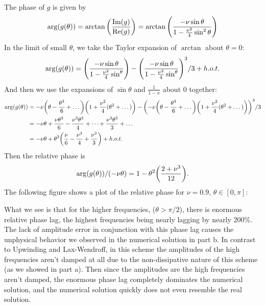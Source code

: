 \documentclass[12pt]{article}
\begin{document}
The phase of $g$ is given by
$$\arg(g(\theta)) = \arctan\qty(\dfrac{\Im(g)}{\Re(g)})= \arctan\qty(\dfrac{-\nu\sin\theta}{1-\frac{\nu^2}{4}\sin^2\theta}) $$
In the limit of small $\theta$, we take the Taylor expansion of $\arctan$ about $\theta=0$:
$$\arg(g(\theta)) = \qty(\dfrac{-\nu\sin\theta}{1-\frac{\nu^2}{4}\sin^\theta}) - \qty(\dfrac{-\nu\sin\theta}{1-\frac{\nu^2}{4}\sin^\theta})^3/3 + h.o.t.$$
And then we use the expansions of $\sin\theta$ and $\frac{1}{1-x}$ about 0 together:
\begin{align*}
\arg(g(\theta)) &= -\nu\qty(\theta-\frac{\theta^3}{6}+\dots)\qty(1+\frac{\nu^2}{4}(\theta^2 + \dots)) - \qty(-\nu\qty(\theta-\frac{\theta^3}{6}+\dots)\qty(1+\frac{\nu^2}{4}(\theta^2 + \dots)))^3/3 \\
&= -\nu \theta + \frac{\nu\theta^3}{6} - \frac{\nu^3\theta^3}{4} + \dots + \dfrac{\nu^3\theta^3}{3} + \dots \\
&= -\nu \theta + \theta^3\qty(\frac{\nu}{6} - \frac{\nu^3}{4}+\dfrac{\nu^3}{3}) + h.o.t.
\end{align*}
Then the relative phase is 
$$\arg(g(\theta))/(-\nu\theta) = 1 - \theta^2\qty(\dfrac{2+\nu^3}{12}).$$
The following figure shows a plot of the relative phase for $\nu=0.9$, $\theta \in [0,\pi]$:
\begin{figure}[H]
\centering{}\end{figure}
What we see is that for the higher frequencies, ($\theta >\pi/2$), there is enormous relative phase lag, the highest frequencies being nearly lagging by nearly $200\%$.  The lack of amplitude error in conjunction with this phase lag causes the unphysical behavior we observed in the numerical solution in part b.  In contrast to Upwinding and Lax-Wendroff, in this scheme the amplitudes of the high frequencies aren't damped at all due to the non-dissipative nature of this scheme (as we showed in part a).  Then since the amplitudes are the high frequencies aren't damped, the enormous phase lag completely dominates the numerical solution, and the numerical solution quickly does not even resemble the real solution.
\end{document}

